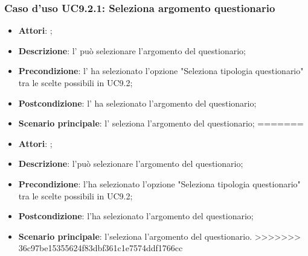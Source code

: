 		\subsubsection{Caso d'uso UC9.2.1: Seleziona argomento questionario}
		\label{UC9.2.1}
		\begin{itemize}
<<<<<<< HEAD
			\item \textbf{Attori}: \uaupro{};
			\item \textbf{Descrizione}: l'\uaupro{} può selezionare l'argomento del questionario; 
			\item \textbf{Precondizione}: l'\uaupro{} ha selezionato l'opzione "Seleziona tipologia questionario" tra le scelte possibili in UC9.2;
			\item \textbf{Postcondizione}: l'\uaupro{} ha selezionato l'argomento del questionario;
			\item \textbf{Scenario principale}: l'\uaupro{} seleziona l'argomento del questionario;
=======
			\item \textbf{Attori}: \uaupro;
			\item \textbf{Descrizione}: l'\uaupro può selezionare l'argomento del questionario; 
			\item \textbf{Precondizione}: l'\uaupro ha selezionato l'opzione "Seleziona tipologia questionario" tra le scelte possibili in UC9.2;
			\item \textbf{Postcondizione}: l'\uaupro ha selezionato l'argomento del questionario;
			\item \textbf{Scenario principale}: l'\uaupro seleziona l'argomento del questionario.
>>>>>>> 36c97be15355624f83dbf361c1e7574ddf1766cc
		\end{itemize}
		

